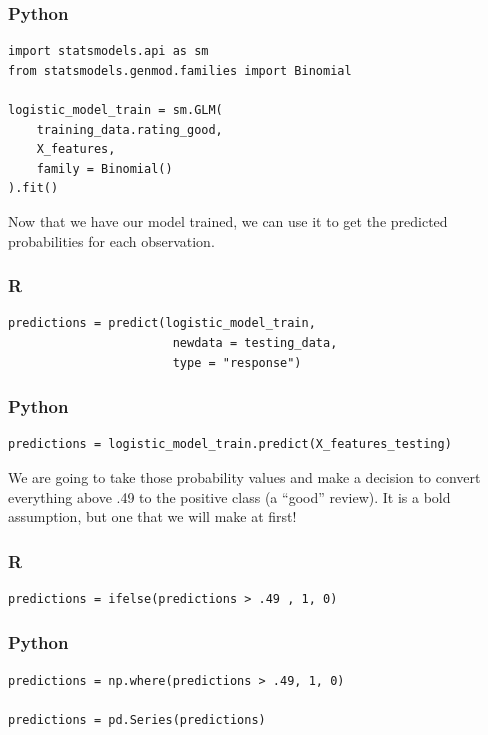 \documentclass[
  letterpaper,
]{krantz}
\begin{document}
\subsubsection{Python}

\begin{verbatim}
import statsmodels.api as sm
from statsmodels.genmod.families import Binomial

logistic_model_train = sm.GLM(
    training_data.rating_good,
    X_features,
    family = Binomial()
).fit()
\end{verbatim}

Now that we have our model trained, we can use it to get the predicted
probabilities for each observation.

\subsubsection{R}

\begin{verbatim}
predictions = predict(logistic_model_train, 
                       newdata = testing_data, 
                       type = "response")
\end{verbatim}

\subsubsection{Python}

\begin{verbatim}
predictions = logistic_model_train.predict(X_features_testing)
\end{verbatim}

We are going to take those probability values and make a decision to
convert everything above .49 to the positive class (a ``good'' review).
It is a bold assumption, but one that we will make at first!

\subsubsection{R}

\begin{verbatim}
predictions = ifelse(predictions > .49 , 1, 0)
\end{verbatim}

\subsubsection{Python}

\begin{verbatim}
predictions = np.where(predictions > .49, 1, 0)

predictions = pd.Series(predictions)
\end{verbatim}
\end{document}
